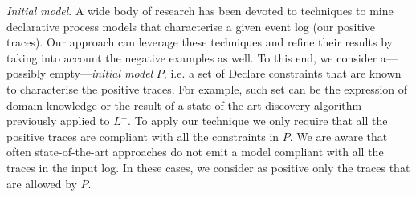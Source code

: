 \documentclass[a4wide,11pt]{article}
\newcommand{\tcolor}[2]{\color{#1}{#2}\color{black}}
\theoremstyle{definition}
\theoremstyle{plain}
\newcommand\paragrafo[1]{{\smallskip \noindent \textit{#1}.}}
\begin{document}
%





\paragrafo{Initial model} A wide body of research has been devoted to techniques to mine declarative process models that characterise a given event log (our positive traces). Our approach can leverage these techniques and refine their results by taking into account the negative examples as well. To this end, we consider a---possibly empty---\emph{initial model} $P$, i.e. a set of Declare constraints that are known to characterise the positive traces. For example, such set can be the expression of domain knowledge or the result of a state-of-the-art discovery algorithm previously applied to $L^+$. To apply our technique we only require that all the positive traces are compliant with all the constraints in $P$. 
We are aware that often state-of-the-art approaches do not emit a model compliant with all the traces in the input log. In these cases, we consider as positive only the traces that are allowed by $P$.
\end{document}
